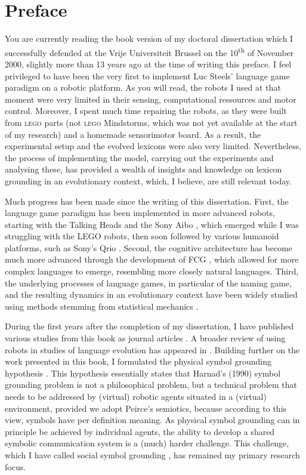 \chapter*{Preface}

You are currently reading the book version of my doctoral dissertation which I successfully defended at the Vrije Universiteit Brussel on the 10\textsuperscript{th} of November 2000, slightly more than 13 years ago at the time of writing this preface. I feel privileged to have been the very first to implement Luc Steels' language game paradigm on a robotic platform. As you will read, the robots I used at that moment were very limited in their sensing, computational ressources and motor control. Moreover, I spent much time repairing the robots, as they were built from \textsc{lego} parts (not \textsc{lego} Mindstorms, which was not yet available at the start of my research) and a homemade sensorimotor board. As a result, the experimental setup and the evolved lexicons were also very limited. Nevertheless, the process of implementing the model, carrying out the experiments and analysing these, has provided a wealth of insights and knowledge on lexicon grounding in an evolutionary context, which, I believe, are still relevant today.

Much progress has been made since the writing of this dissertation. First, the language game paradigm has been implemented in more advanced robots, starting with the Talking Heads \citep{steelsetal:2002} and the Sony Aibo \citep{steelskaplan:2000}, which emerged while I was struggling with the LEGO robots, then soon followed by various humanoid platforms, such as Sony's Qrio \citep[see, e.g., ][ and this book series]{steels:2012}. Second, the cognitive architecture has become much more advanced through the development of FCG \citep{steelsdebeule:2006}, which allowed for more complex languages to emerge, resembling more closely natural languages. Third, the underlying processes of language games, in particular of the naming game, and the resulting dynamics in an evolutionary context have been widely studied using methods stemming from statistical mechanics \citep[e.g., ][]{baronchellietal:2006a}.

During the first years after the completion of my dissertation, I have published various studies from this book as journal articles \citep{vogt:2000c,vogt:2002a,vogt:2003a}. A broader review of using robots in studies of language evolution has appeared in \citet{vogt:2006a}. Building further on the work presented in this book, I formulated the {\sc physical symbol grounding hypothesis} \citep{vogt:2002a}. This hypothesis essentially states that Harnad's (1990) symbol grounding problem is not a philosophical problem, but a technical problem that needs to be addressed by (virtual) robotic agents situated in a (virtual) environment, provided we adopt Peirce's semiotics, because according to this view, symbols have per definition meaning. As physical symbol grounding can in principle be achieved by individual agents, the ability to develop a shared symbolic communication system is a (much) harder challenge. This challenge, which I have called {\sc social symbol grounding} \citep{vogtdivina:2007}, has remained my primary research focus.

